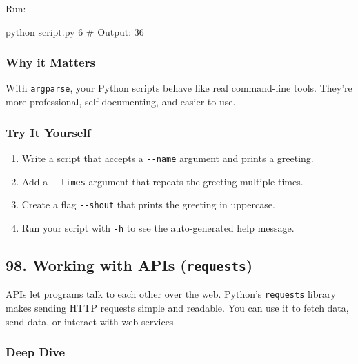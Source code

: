 \documentclass[
  letterpaper,
  DIV=11,
  numbers=noendperiod]{scrreprt}
\newenvironment{Shaded}{\begin{snugshade}}{\end{snugshade}}
\newcommand{\CommentTok}[1]{\textcolor[rgb]{0.37,0.37,0.37}{#1}}
\newcommand{\ExtensionTok}[1]{\textcolor[rgb]{0.00,0.23,0.31}{#1}}
\newcommand{\NormalTok}[1]{\textcolor[rgb]{0.00,0.23,0.31}{#1}}
\providecommand{\tightlist}{%
  \setlength{\itemsep}{0pt}\setlength{\parskip}{0pt}}
\begin{document}
Run:

\begin{Shaded}
\begin{Highlighting}[]
\ExtensionTok{python}\NormalTok{ script.py 6}
\CommentTok{\# Output: 36}
\end{Highlighting}
\end{Shaded}

\subsubsection{Why it Matters}\label{why-it-matters-96}

With \texttt{argparse}, your Python scripts behave like real
command-line tools. They're more professional, self-documenting, and
easier to use.

\subsubsection{Try It Yourself}\label{try-it-yourself-96}

\begin{enumerate}
\def\labelenumi{\arabic{enumi}.}
\tightlist
\item
  Write a script that accepts a \texttt{-\/-name} argument and prints a
  greeting.
\item
  Add a \texttt{-\/-times} argument that repeats the greeting multiple
  times.
\item
  Create a flag \texttt{-\/-shout} that prints the greeting in
  uppercase.
\item
  Run your script with \texttt{-h} to see the auto-generated help
  message.
\end{enumerate}

\subsection{\texorpdfstring{98. Working with APIs
(\texttt{requests})}{98. Working with APIs (requests)}}\label{working-with-apis-requests}

APIs let programs talk to each other over the web. Python's
\texttt{requests} library makes sending HTTP requests simple and
readable. You can use it to fetch data, send data, or interact with web
services.

\subsubsection{Deep Dive}\label{deep-dive-97}
\end{document}
